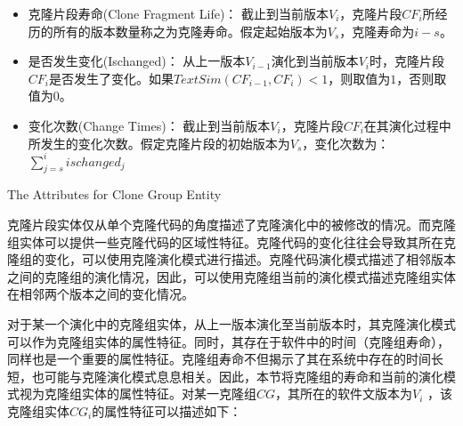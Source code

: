 \begin{itemize}
\item
克隆片段寿命(Clone Fragment Life)：
截止到当前版本$V_ i $，克隆片段$CF_i$所经历的所有的版本数量称之为克隆寿命。假定起始版本为$V_s$，克隆寿命为$i - s$。
\item
是否发生变化(Ischanged)：
从上一版本$V_{i-1} $演化到当前版本$V_ i $时，克隆片段$CF_i$是否发生了变化。如果$\mathit{TextSim}(CF_{i-1}, CF_{i}) < 1$，则取值为$1$，否则取值为$0$。
\item
变化次数(Change Times)：
截止到当前版本$V_ i $，克隆片段$CF_i$在其演化过程中所发生的变化次数。假定克隆片段的初始版本为$V_s$，变化次数为：$\sum_{j=s}^i{ischanged_j}$
\end{itemize}

{The Attributes for Clone Group Entity}

克隆片段实体仅从单个克隆代码的角度描述了克隆演化中的被修改的情况。而克隆组实体可以提供一些克隆代码的区域性特征。克隆代码的变化往往会导致其所在克隆组的变化，可以使用克隆演化模式进行描述。克隆代码演化模式描述了相邻版本之间的克隆组的演化情况，因此，可以使用克隆组当前的演化模式描述克隆组实体在相邻两个版本之间的变化情况。

对于某一个演化中的克隆组实体，从上一版本演化至当前版本时，其克隆演化模式可以作为克隆组实体的属性特征。同时，其存在于软件中的时间（克隆组寿命），同样也是一个重要的属性特征。克隆组寿命不但揭示了其在系统中存在的时间长短，也可能与克隆演化模式息息相关。因此，本节将克隆组的寿命和当前的演化模式视为克隆组实体的属性特征。对某一克隆组$CG$，其所在的软件文版本为$V_i $ ，该克隆组实体{$CG_i$}的属性特征可以描述如下：

